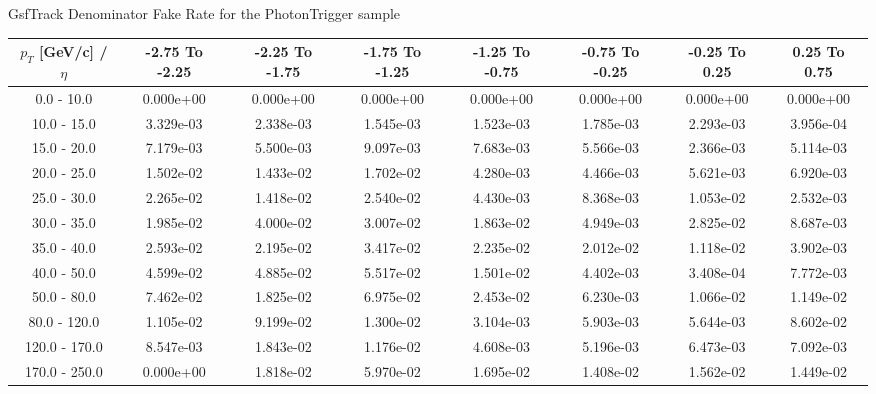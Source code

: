\large 
GsfTrack Denominator Fake Rate for the PhotonTrigger sample
\footnotesize 
\begin{tabular*}{\textwidth}{|c|c|c|c|c|c|c|c|}\hline 
$p_T$ [GeV/c] / $\eta$  & -2.75 To -2.25 & -2.25 To -1.75 & -1.75 To -1.25 & -1.25 To -0.75 & -0.75 To -0.25 & -0.25 To 0.25 & 0.25 To 0.75 \\ 
 \hline 
0.0 - 10.0 & 0.000e+00 & 0.000e+00 & 0.000e+00 & 0.000e+00 & 0.000e+00 & 0.000e+00 & 0.000e+00 \\ 
10.0 - 15.0 & 3.329e-03 & 2.338e-03 & 1.545e-03 & 1.523e-03 & 1.785e-03 & 2.293e-03 & 3.956e-04 \\ 
15.0 - 20.0 & 7.179e-03 & 5.500e-03 & 9.097e-03 & 7.683e-03 & 5.566e-03 & 2.366e-03 & 5.114e-03 \\ 
20.0 - 25.0 & 1.502e-02 & 1.433e-02 & 1.702e-02 & 4.280e-03 & 4.466e-03 & 5.621e-03 & 6.920e-03 \\ 
25.0 - 30.0 & 2.265e-02 & 1.418e-02 & 2.540e-02 & 4.430e-03 & 8.368e-03 & 1.053e-02 & 2.532e-03 \\ 
30.0 - 35.0 & 1.985e-02 & 4.000e-02 & 3.007e-02 & 1.863e-02 & 4.949e-03 & 2.825e-02 & 8.687e-03 \\ 
35.0 - 40.0 & 2.593e-02 & 2.195e-02 & 3.417e-02 & 2.235e-02 & 2.012e-02 & 1.118e-02 & 3.902e-03 \\ 
40.0 - 50.0 & 4.599e-02 & 4.885e-02 & 5.517e-02 & 1.501e-02 & 4.402e-03 & 3.408e-04 & 7.772e-03 \\ 
50.0 - 80.0 & 7.462e-02 & 1.825e-02 & 6.975e-02 & 2.453e-02 & 6.230e-03 & 1.066e-02 & 1.149e-02 \\ 
80.0 - 120.0 & 1.105e-02 & 9.199e-02 & 1.300e-02 & 3.104e-03 & 5.903e-03 & 5.644e-03 & 8.602e-02 \\ 
120.0 - 170.0 & 8.547e-03 & 1.843e-02 & 1.176e-02 & 4.608e-03 & 5.196e-03 & 6.473e-03 & 7.092e-03 \\ 
170.0 - 250.0 & 0.000e+00 & 1.818e-02 & 5.970e-02 & 1.695e-02 & 1.408e-02 & 1.562e-02 & 1.449e-02 \\ 
 \hline 
\end{tabular*} 
